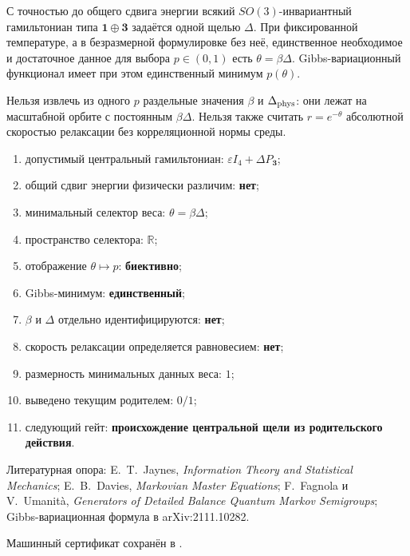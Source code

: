 \begin{theorem}
С точностью до общего сдвига энергии всякий $SO(3)$-инвариантный
гамильтониан типа $\mathbf1\oplus\mathbf3$ задаётся одной щелью $\Delta$.
При фиксированной температуре, а в безразмерной формулировке без неё,
единственное необходимое и достаточное данное для выбора $p\in(0,1)$ есть
$\theta=\beta\Delta$. Gibbs-вариационный функционал имеет при этом
единственный минимум $p(\theta)$.
\end{theorem}

\begin{nogocriterion}
Нельзя извлечь из одного $p$ раздельные значения $\beta$ и
$\Delta_{\rm phys}$: они лежат на масштабной орбите с постоянным
$\beta\Delta$. Нельзя также считать $r=e^{-\theta}$ абсолютной скоростью
релаксации без корреляционной нормы среды.
\end{nogocriterion}

\begin{protocol}\begin{enumerate}
\item допустимый центральный гамильтониан: \textbf{$\varepsilon I_4+\Delta P_{\mathbf3}$};
\item общий сдвиг энергии физически различим: \textbf{нет};
\item минимальный селектор веса: \textbf{$\theta=\beta\Delta$};
\item пространство селектора: \textbf{$\mathbb R$};
\item отображение $\theta\mapsto p$: \textbf{биективно};
\item Gibbs-минимум: \textbf{единственный};
\item $\beta$ и $\Delta$ отдельно идентифицируются: \textbf{нет};
\item скорость релаксации определяется равновесием: \textbf{нет};
\item размерность минимальных данных веса: \textbf{$1$};
\item выведено текущим родителем: \textbf{$0/1$};
\item следующий гейт: \textbf{происхождение центральной щели из родительского действия}.
\end{enumerate}\end{protocol}

Литературная опора: E.~T.~Jaynes, \emph{Information Theory and Statistical
Mechanics}; E.~B.~Davies, \emph{Markovian Master Equations};
F.~Fagnola и V.~Umanit\`a, \emph{Generators of Detailed Balance Quantum
Markov Semigroups}; Gibbs-вариационная формула в arXiv:2111.10282.

Машинный сертификат сохранён в
.